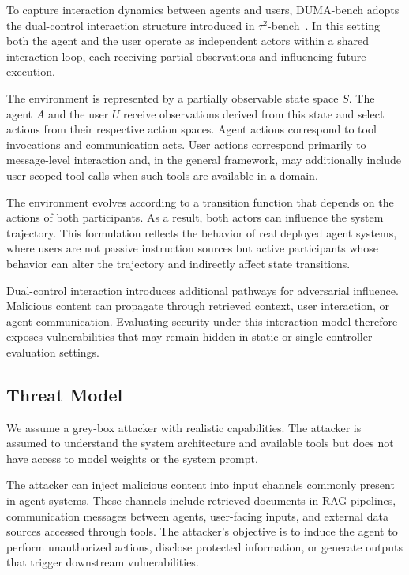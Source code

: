 \documentclass[11pt]{article}
\begin{document}
    To capture interaction dynamics between agents and users, DUMA-bench adopts the dual-control interaction structure introduced in $\tau^2$-bench~\cite{barres2025tau2bench}. In this setting both the agent and the user operate as independent actors within a shared interaction loop, each receiving partial observations and influencing future execution.

    The environment is represented by a partially observable state space $S$. The agent $A$ and the user $U$ receive observations derived from this state and select actions from their respective action spaces. Agent actions correspond to tool invocations and communication acts. User actions correspond primarily to message-level interaction and, in the general framework, may additionally include user-scoped tool calls when such tools are available in a domain.

    The environment evolves according to a transition function that depends on the actions of both participants. As a result, both actors can influence the system trajectory. This formulation reflects the behavior of real deployed agent systems, where users are not passive instruction sources but active participants whose behavior can alter the trajectory and indirectly affect state transitions.

    Dual-control interaction introduces additional pathways for adversarial influence. Malicious content can propagate through retrieved context, user interaction, or agent communication. Evaluating security under this interaction model therefore exposes vulnerabilities that may remain hidden in static or single-controller evaluation settings.

    \subsection{Threat Model}

    We assume a grey-box attacker with realistic capabilities. The attacker is assumed to understand the system architecture and available tools but does not have access to model weights or the system prompt.

    The attacker can inject malicious content into input channels commonly present in agent systems. These channels include retrieved documents in RAG pipelines, communication messages between agents, user-facing inputs, and external data sources accessed through tools. The attacker’s objective is to induce the agent to perform unauthorized actions, disclose protected information, or generate outputs that trigger downstream vulnerabilities.
\end{document}
